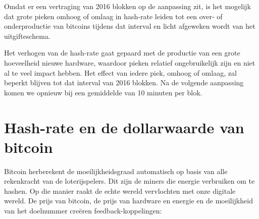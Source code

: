 \documentclass[smalldemyvopaper,11pt,twoside,onecolumn,openright,extrafontsizes]{memoir}
\begin{document}
Omdat er een vertraging van 2016 blokken op de aanpassing zit, is het mogelijk dat grote pieken omhoog of omlaag in hash-rate leiden tot een over- of onderproductie van bitcoins tijdens dat interval en licht afgeweken wordt van het uitgifteschema.

Het verhogen van de hash-rate gaat gepaard met de productie van een grote hoeveelheid nieuwe hardware, waardoor pieken relatief ongebruikelijk zijn en niet al te veel impact hebben. Het effect van iedere piek, omhoog of omlaag, zal beperkt blijven tot dat interval van 2016 blokken. Na de volgende aanpassing komen we opnieuw bij een gemiddelde van 10 minuten per blok.

\section{Hash-rate en de dollarwaarde van bitcoin}
Bitcoin herberekent de moeilijkheidsgraad automatisch op basis van alle rekenkracht van de loterijspelers. Dit zijn de miners die energie verbruiken om te hashen. Op die manier raakt de echte wereld vervlochten met onze digitale wereld. De prijs van bitcoin, de prijs van hardware en energie en de moeilijkheid van het doelnummer creëren feedback-koppelingen:
\end{document}
